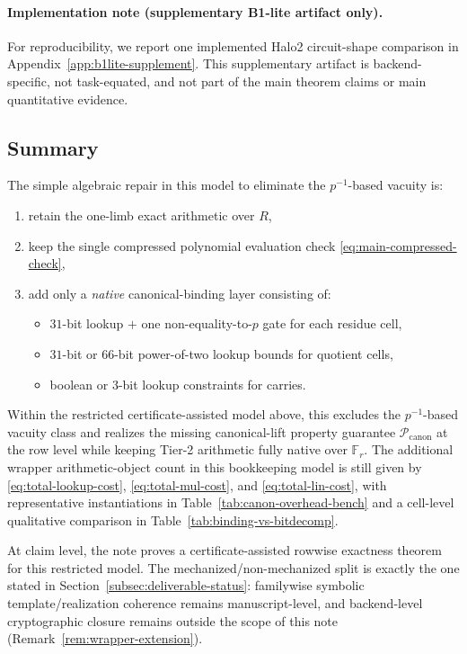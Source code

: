 ﻿\documentclass[11pt]{article}
\newcommand{\F}{\mathbb{F}}
\begin{document}
\paragraph{Implementation note (supplementary B1-lite artifact only).}
For reproducibility, we report one implemented Halo2 circuit-shape comparison
in Appendix~\ref{app:b1lite-supplement}. This supplementary artifact is
backend-specific, not task-equated, and not part of the main theorem
claims or main quantitative evidence.

\subsection{Summary}

The simple algebraic repair in this model to eliminate the \(p^{-1}\)-based vacuity is:
\begin{enumerate}[label=(\arabic*),leftmargin=2em]
    \item retain the one-limb exact arithmetic over \(R\),
    \item keep the single compressed polynomial evaluation check \eqref{eq:main-compressed-check},
    \item add only a \emph{native} canonical-binding layer consisting of:
    \begin{itemize}[leftmargin=2em]
        \item \(31\)-bit lookup \(+\) one non-equality-to-\(p\) gate for each residue cell,
        \item \(31\)-bit or \(66\)-bit power-of-two lookup bounds for quotient cells,
        \item boolean or \(3\)-bit lookup constraints for carries.
    \end{itemize}
\end{enumerate}

Within the restricted certificate-assisted model above, this excludes the
\(p^{-1}\)-based vacuity class and realizes the missing canonical-lift property
guarantee \(\mathcal{P}_{\mathrm{canon}}\) at the row level while keeping Tier-2
arithmetic fully native over \(\F_r\). The additional wrapper
arithmetic-object count in this bookkeeping model is still given by
\eqref{eq:total-lookup-cost}, \eqref{eq:total-mul-cost}, and
\eqref{eq:total-lin-cost}, with representative instantiations in
Table~\ref{tab:canon-overhead-bench} and a cell-level qualitative comparison in
Table~\ref{tab:binding-vs-bitdecomp}.

At claim level, the note proves a certificate-assisted rowwise exactness theorem
for this restricted model. The mechanized/non-mechanized split is exactly the
one stated in Section~\ref{subsec:deliverable-status}: familywise symbolic
template/realization coherence remains manuscript-level, and backend-level
cryptographic closure remains outside the scope of this note
(Remark~\ref{rem:wrapper-extension}).
\end{document}
